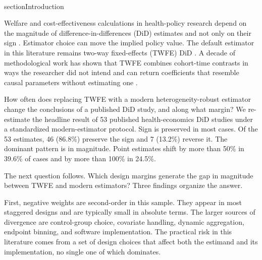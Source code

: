 \documentclass[11pt]{article}
\begin{document}





\\section{Introduction}
\label{Chapter1}

Welfare and cost-effectiveness calculations in health-policy research depend on the magnitude of difference-in-differences (DiD) estimates and not only on their sign \parencite{hendren2020unified,finkelstein2020welfare}. Estimator choice can move the implied policy value. The default estimator in this literature remains two-way fixed-effects (TWFE) DiD \parencite{angrist2010credibility}. A decade of methodological work has shown that TWFE combines cohort-time contrasts in ways the researcher did not intend and can return coefficients that resemble causal parameters without estimating one \parencite{goodman2021difference,dechaisemartin2020twfe,callaway2021difference,roth2023s}.

How often does replacing TWFE with a modern heterogeneity-robust estimator change the conclusions of a published DiD study, and along what margin? We re-estimate the headline result of 53 published health-economics DiD studies under a standardized modern-estimator protocol. Sign is preserved in most cases. Of the 53 estimates, 46 (86.8\%) preserve the sign and 7 (13.2\%) reverse it. The dominant pattern is in magnitude. Point estimates shift by more than 50\% in 39.6\% of cases and by more than 100\% in 24.5\%.

The next question follows. Which design margins generate the gap in magnitude between TWFE and modern estimators? Three findings organize the answer.

First, negative weights are second-order in this sample. They appear in most staggered designs and are typically small in absolute terms. The larger sources of divergence are control-group choice, covariate handling, dynamic aggregation, endpoint binning, and software implementation. The practical risk in this literature comes from a set of design choices that affect both the estimand and its implementation, no single one of which dominates.
\end{document}
